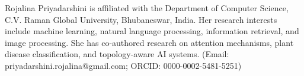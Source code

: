 \documentclass[twocolumn]{ICCKjournal}
\begin{document}
  \begin{biography}[author2]{Rojalina Priyadarshini} is affiliated with the Department of Computer Science, C.V. Raman Global University, Bhubaneswar, India. Her research interests include machine learning, natural language processing, information retrieval, and image processing. She has co-authored research on attention mechanisms, plant disease classification, and topology-aware AI systems. (Email: priyadarshini.rojalina@gmail.com; ORCID: 0000-0002-5481-5251)
  \end{biography}

\else
\fi
\makeatother
\end{document}
